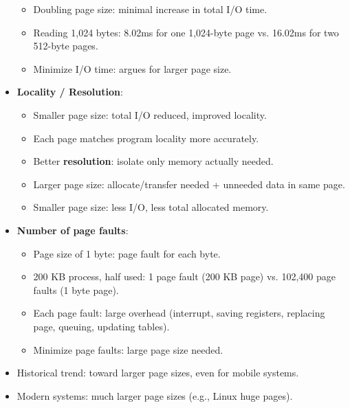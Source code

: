\begin{itemize}
\begin{itemize}
        \item Doubling page size: minimal increase in total I/O time.
        \item Reading 1,024 bytes: 8.02ms for one 1,024-byte page vs. 16.02ms for two 512-byte pages.
        \item Minimize I/O time: argues for larger page size.
    \end{itemize}
    \item \textbf{Locality / Resolution}:
    \begin{itemize}
        \item Smaller page size: total I/O reduced, improved locality.
        \item Each page matches program locality more accurately.
        \item Better \textbf{resolution}: isolate only memory actually needed.
        \item Larger page size: allocate/transfer needed + unneeded data in same page.
        \item Smaller page size: less I/O, less total allocated memory.
    \end{itemize}
    \item \textbf{Number of page faults}:
    \begin{itemize}
        \item Page size of 1 byte: page fault for each byte.
        \item 200 KB process, half used: 1 page fault (200 KB page) vs. 102,400 page faults (1 byte page).
        \item Each page fault: large overhead (interrupt, saving registers, replacing page, queuing, updating tables).
        \item Minimize page faults: large page size needed.
    \end{itemize}
    \item Historical trend: toward larger page sizes, even for mobile systems.
    \item Modern systems: much larger page sizes (e.g., Linux huge pages).
\end{itemize}

